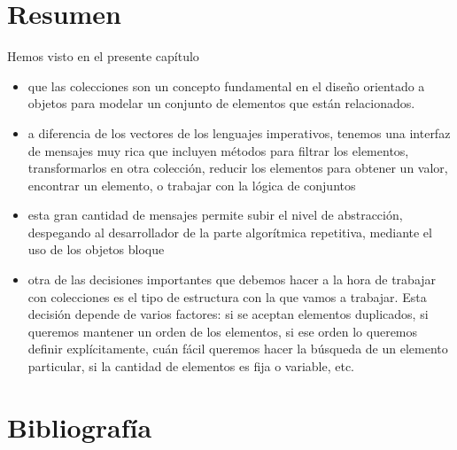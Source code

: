 \documentclass[a4paper,12pt]{book}
\begin{document}
{\section{Resumen}

Hemos visto en el presente capítulo

\begin{itemize}
 \item que las colecciones son un concepto fundamental en el diseño orientado a objetos para modelar un conjunto
 de elementos que están relacionados. 
 \item a diferencia de los vectores de los lenguajes imperativos, tenemos una interfaz de mensajes muy rica que
 incluyen métodos para filtrar los elementos, transformarlos en otra colección, reducir los elementos para obtener
 un valor, encontrar un elemento, o trabajar con la lógica de conjuntos
 \item esta gran cantidad de mensajes permite subir el nivel de abstracción, despegando al desarrollador de la
 parte algorítmica repetitiva, mediante el uso de los objetos bloque
 \item otra de las decisiones importantes que debemos hacer a la hora de trabajar con colecciones es el tipo
 de estructura con la que vamos a trabajar. Esta decisión depende de varios factores: si se aceptan elementos
 duplicados, si queremos mantener un orden de los elementos, si ese orden lo queremos definir explícitamente,
 cuán fácil queremos hacer la búsqueda de un elemento particular, si la cantidad de elementos es fija o variable,
 etc.
\end{itemize}


\section{Bibliografía}

}
\end{document}
